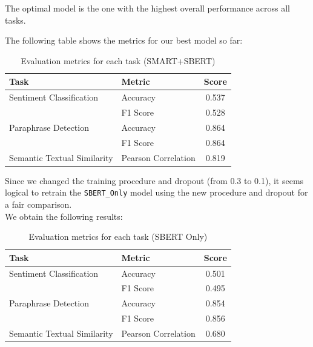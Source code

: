 The optimal model is the one with the highest overall performance across all tasks.

The following table shows the metrics for our best model so far:

\begin{table}[H]
    \centering
    \begin{tabular}{|l|l|c|}
    \hline
    \textbf{Task} & \textbf{Metric} & \textbf{Score} \\
    \hline
    Sentiment Classification & Accuracy & 0.537 \\
    & F1 Score & 0.528 \\
    \hline
    Paraphrase Detection & Accuracy & 0.864 \\
    & F1 Score & 0.864 \\
    \hline
    Semantic Textual Similarity & Pearson Correlation & 0.819 \\
    \hline
    \end{tabular}
    \caption{Evaluation metrics for each task (SMART+SBERT)}
\end{table}
    
Since we changed the training procedure and dropout (from 0.3 to 0.1), it seems logical to retrain the \texttt{SBERT\_Only} model using the new procedure and dropout for a fair comparison.\\
We obtain the following results:

\begin{table}[H]
    \centering
    \begin{tabular}{|l|l|c|}
    \hline
    \textbf{Task} & \textbf{Metric} & \textbf{Score} \\
    \hline
    Sentiment Classification & Accuracy & 0.501 \\
    & F1 Score & 0.495 \\
    \hline
    Paraphrase Detection & Accuracy & 0.854 \\
    & F1 Score & 0.856 \\
    \hline
    Semantic Textual Similarity & Pearson Correlation & 0.680 \\
    \hline
    \end{tabular}
    \caption{Evaluation metrics for each task (SBERT Only)}
\end{table}

